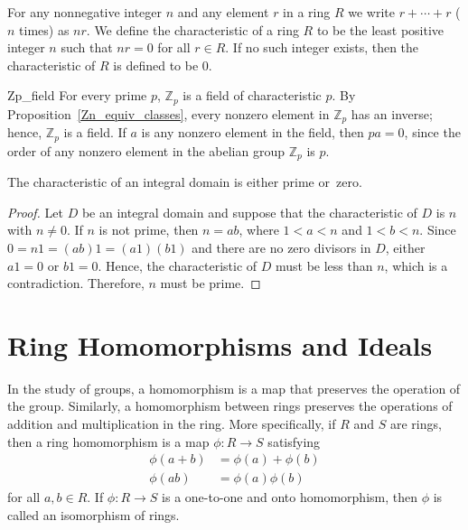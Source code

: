 
\medskip
 
 
For any nonnegative integer $n$ and any element $r$ in a ring $R$ we 
write $r + \cdots + r$ ($n$ times) as $nr$. We  define the {\bfi
characteristic\/}\label{ringchar} of a ring $R$ to 
be the least positive integer $n$ such that $nr=0$ for all $r \in R$.
If no such integer exists, then the characteristic of $R$ is defined
to be 0.  
 
 
\begin{example}{Zp_field}
For every prime $p$, ${\mathbb Z}_p$ is a field of characteristic $p$. By
Proposition~\ref{Zn_equiv_classes}, every nonzero element in ${\mathbb Z}_p$ has an inverse;
hence, ${\mathbb Z}_p$ is a field. If $a$ is any nonzero element in the
field, then $pa =0$, since the order of any nonzero element in the
abelian group ${\mathbb Z}_p$ is $p$. 
\end{example}
 
 
\begin{theorem}
The characteristic of an integral domain is either prime or~zero.
\end{theorem}
 
 
\begin{proof}
Let $D$ be an integral domain and suppose that the characteristic of
$D$ is $n$ with $n \neq 0$. If $n$ is not prime, then $n = ab$, where
$1 < a <n$ and $1 < b < n$. Since $0 = n 1 = (ab)1 = (a1)(b1)$ and
there are no zero divisors in $D$, either $a1 =0$ or $b1=0$. Hence,
the characteristic of $D$ must be less than $n$, which is a
contradiction.  Therefore, $n$ must be prime. 
\end{proof}
 
 
 
\section{Ring Homomorphisms and Ideals}
 
 
In the study of groups, a homomorphism is a map that preserves the
operation of the group.  Similarly, a homomorphism between rings
preserves the operations of addition and multiplication in the ring.
More specifically, if  $R$ and $S$ are rings, then   a {\bfi ring
homomorphism\/} is a
map $\phi : R \rightarrow S$ satisfying  
\begin{align*}
\phi( a + b ) & = \phi( a ) + \phi(b) \\
\phi( a b ) & = \phi( a ) \phi(b)
\end{align*}
for all $a, b \in R$.  
If $\phi : R \rightarrow S$ is a one-to-one and onto homomorphism,
then $\phi$ is called an {\bfi
isomorphism\/} of rings.   
 
